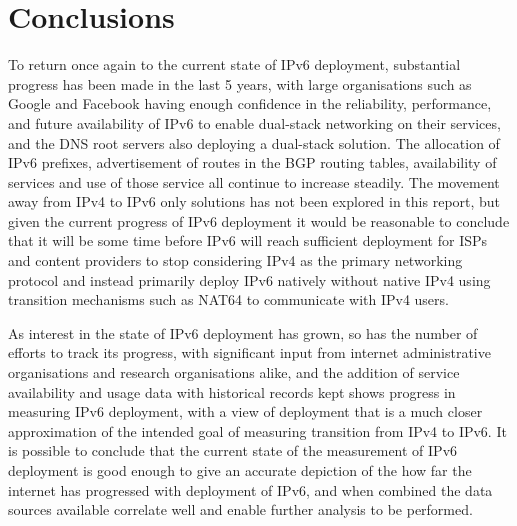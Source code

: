 \section{Conclusions}


To return once again to the current state of IPv6 deployment, substantial
progress has been made in the last 5 years, with large organisations such as
Google and Facebook having enough confidence in the reliability, performance,
and future availability of IPv6 to enable dual-stack networking on their
services, and the DNS root servers also deploying a dual-stack solution. The
allocation of IPv6 prefixes, advertisement of routes in the BGP routing tables,
availability of services and use of those service all continue to increase
steadily. The movement away from IPv4 to IPv6 only solutions has not been
explored in this report, but given the current progress of IPv6 deployment it
would be reasonable to conclude that it will be some time before IPv6 will reach
sufficient deployment for ISPs and content providers to stop considering IPv4 as
the primary networking protocol and instead primarily deploy IPv6 natively
without native IPv4 using transition mechanisms such as NAT64 to communicate
with IPv4 users.

As interest in
the state of IPv6 deployment has grown, so has the number of efforts to track
its progress, with significant input from internet administrative organisations
and research organisations alike, and the addition of service availability and
usage data with historical records kept shows progress in measuring IPv6
deployment, with a view of deployment that is a much closer 
approximation of the intended goal of measuring transition from IPv4 to IPv6.
It is possible to conclude that the current state of the measurement of IPv6
deployment is good enough to give an accurate depiction of the how far the
internet has progressed with deployment of IPv6, and when combined the data
sources available correlate well and enable further analysis to be performed.

